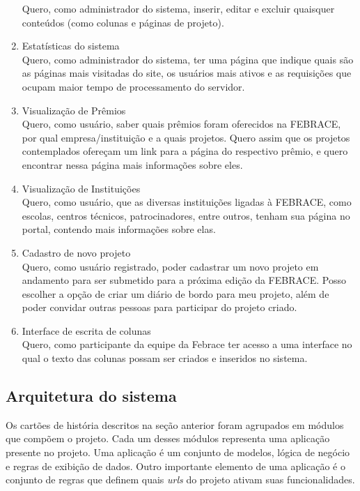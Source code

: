 \begin{enumerate}
        Quero, como administrador do sistema, inserir, editar e excluir quaisquer conteúdos (como colunas e páginas de projeto).
      \item Estatísticas do sistema \\
        Quero, como administrador do sistema, ter uma página que indique quais são as páginas mais visitadas do site, os usuários mais ativos e as requisições que ocupam maior tempo de processamento do servidor.
      \item Visualização de Prêmios \\
        Quero, como usuário, saber quais prêmios foram oferecidos na FEBRACE, por qual empresa/instituição e a quais projetos. Quero assim que os projetos contemplados ofereçam um link para a página do respectivo prêmio, e quero encontrar nessa página mais informações sobre eles.
      \item Visualização de Instituições \\
        Quero, como usuário, que as diversas instituições ligadas à FEBRACE, como escolas, centros técnicos, patrocinadores, entre outros, tenham sua página no portal, contendo mais informações sobre elas.
      \item Cadastro de novo projeto \\
        Quero, como usuário registrado, poder cadastrar um novo projeto em andamento para ser submetido para a próxima edição da FEBRACE. Posso escolher a opção de criar um diário de bordo para meu projeto, além de poder convidar outras pessoas para participar do projeto criado.
      \item Interface de escrita de colunas \\
        Quero, como participante da equipe da Febrace ter acesso a uma interface no qual o texto das colunas possam ser criados e inseridos no sistema.
    \end{enumerate}

  \subsection{Arquitetura do sistema}

    Os cartões de história descritos na seção anterior foram agrupados em módulos que compõem o projeto. Cada um desses módulos representa uma aplicação presente no projeto. Uma aplicação é um conjunto de modelos, lógica de negócio e regras de exibição de dados. Outro importante elemento de uma aplicação é o conjunto de regras que definem quais \textit{urls} do projeto ativam suas funcionalidades.


